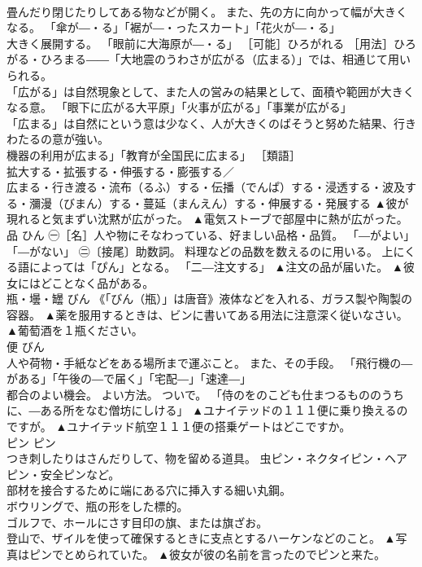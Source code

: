 \documentclass[8pt]{extreport}
\begin{document}
\begin{CJK}{UTF8}{min}
\\	畳んだり閉じたりしてある物などが開く。 また、先の方に向かって幅が大きくなる。 「傘が―・る」「裾が―・ったスカート」「花火が―・る」 
\\	大きく展開する。 「眼前に大海原が―・る」 ［可能］ひろがれる ［用法］ひろがる・ひろまる――「大地震のうわさが広がる（広まる）」では、相通じて用いられる。 
\\	「広がる」は自然現象として、また人の営みの結果として、面積や範囲が大きくなる意。 「眼下に広がる大平原」「火事が広がる」「事業が広がる」
\\	「広まる」は自然にという意は少なく、人が大きくのばそうと努めた結果、行きわたるの意が強い。 
\\	機器の利用が広まる」「教育が全国民に広まる」 ［類語］
\\	拡大する・拡張する・伸張する・膨張する／
\\	広まる・行き渡る・流布（るふ）する・伝播（でんぱ）する・浸透する・波及する・瀰漫（びまん）する・蔓延（まんえん）する・伸展する・発展する	▲彼が現れると気まずい沈黙が広がった。 ▲電気ストーブで部屋中に熱が広がった。
\\	品	ひん	㊀［名］人や物にそなわっている、好ましい品格・品質。 「―がよい」「―がない」 ㊁〔接尾〕助数詞。 料理などの品数を数えるのに用いる。 上にくる語によっては「ぴん」となる。 「二―注文する」	▲注文の品が届いた。 ▲彼女にはどことなく品がある。
\\	瓶・壜・罎	びん	《「びん（瓶）」は唐音》液体などを入れる、ガラス製や陶製の容器。	▲薬を服用するときは、ビンに書いてある用法に注意深く従いなさい。 ▲葡萄酒を１瓶ください。
\\	便	びん	
\\	人や荷物・手紙などをある場所まで運ぶこと。 また、その手段。 「飛行機の―がある」「午後の―で届く」「宅配―」「速達―」 
\\	都合のよい機会。 よい方法。 ついで。 「侍のをのこども仕まつるもののうちに、―ある所をなむ僧坊にしける」	▲ユナイテッドの１１１便に乗り換えるのですが。 ▲ユナイテッド航空１１１便の搭乗ゲートはどこですか。
\\	ピン	ピン	
\\	つき刺したりはさんだりして、物を留める道具。 虫ピン・ネクタイピン・ヘアピン・安全ピンなど。 
\\	部材を接合するために端にある穴に挿入する細い丸鋼。 
\\	ボウリングで、瓶の形をした標的。 
\\	ゴルフで、ホールにさす目印の旗、または旗ざお。 
\\	登山で、ザイルを使って確保するときに支点とするハーケンなどのこと。	▲写真はピンでとめられていた。 ▲彼女が彼の名前を言ったのでピンと来た。

\end{CJK}
\end{document}
